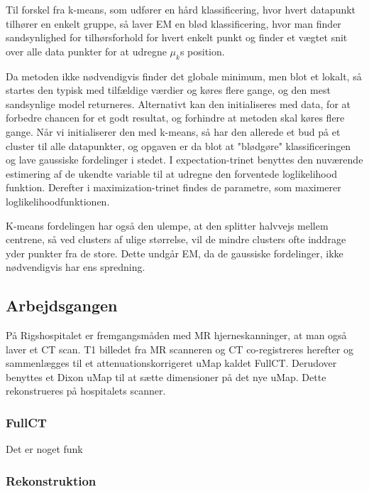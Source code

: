 Til forskel fra k-means, som udfører en hård klassificering, hvor hvert
datapunkt tilhører en enkelt gruppe, så laver EM en blød klassificering, hvor
man finder sandsynlighed for tilhørsforhold for hvert enkelt punkt og finder et
vægtet snit over alle data punkter for at udregne $\mu_k$s position.

Da metoden ikke nødvendigvis finder det globale minimum, men blot et lokalt,
så startes den typisk med tilfældige værdier og køres flere gange, og
den mest sandsynlige model returneres. Alternativt kan den initialiseres med
data, for at forbedre chancen for et godt resultat, og forhindre at metoden
skal køres flere gange. Når vi initialiserer den med k-means, så har den
allerede et bud på et cluster til alle datapunkter, og opgaven er da blot
at "blødgøre" klassificeringen og lave gaussiske fordelinger i stedet. I
expectation-trinet benyttes den nuværende estimering af de ukendte variable til
at udregne den forventede loglikelihood funktion. Derefter i
maximization-trinet findes de parametre, som maximerer loglikelihoodfunktionen.

K-means fordelingen har også den ulempe, at den splitter halvvejs mellem
centrene, så ved clusters af ulige størrelse, vil de mindre clusters ofte
inddrage yder punkter fra de store. Dette undgår EM, da de gaussiske
fordelinger, ikke nødvendigvis har ens spredning.



\subsection{Arbejdsgangen}


På Rigshospitalet er fremgangsmåden med MR
hjerneskanninger, at man også laver et CT scan. T1 billedet fra MR scanneren
og CT co-registreres herefter og sammenlægges til et attenuationskorrigeret
uMap kaldet FullCT. Derudover benyttes et Dixon uMap til at sætte dimensioner
på det nye uMap. Dette rekonstrueres på hospitalets scanner.


\subsubsection{FullCT}


Det er noget funk

\subsubsection{Rekonstruktion}

